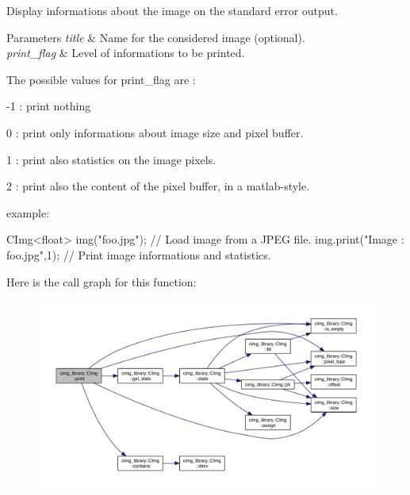 Display informations about the image on the standard error output. 


\begin{DoxyParams}{Parameters}
{\em title} & Name for the considered image (optional). \\
\hline
{\em print\-\_\-flag} & Level of informations to be printed.\\
\hline
\end{DoxyParams}

\begin{DoxyItemize}
\item The possible values for {\ttfamily print\-\_\-flag} are \-:
\begin{DoxyItemize}
\item -\/1 \-: print nothing
\item 0 \-: print only informations about image size and pixel buffer.
\item 1 \-: print also statistics on the image pixels.
\item 2 \-: print also the content of the pixel buffer, in a matlab-\/style.
\end{DoxyItemize}
\end{DoxyItemize}

\begin{DoxyParagraph}{example\-:}

\begin{DoxyCode}
CImg<float> img(\textcolor{stringliteral}{"foo.jpg"});      \textcolor{comment}{// Load image from a JPEG file.}
img.print(\textcolor{stringliteral}{"Image : foo.jpg"},1);  \textcolor{comment}{// Print image informations and statistics.}
\end{DoxyCode}
 
\end{DoxyParagraph}


Here is the call graph for this function\-:
\nopagebreak
\begin{figure}[H]
\begin{center}
\leavevmode
\includegraphics[width=350pt]{structcimg__library_1_1_c_img_a79c910f70e49d74484d76d64c2302bf3_cgraph}
\end{center}
\end{figure}




